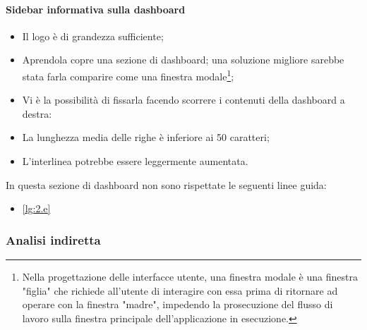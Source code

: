 \paragraph{Sidebar informativa sulla dashboard}
\begin{itemize}
    \item Il logo è di grandezza sufficiente;
    \item Aprendola copre una sezione di dashboard; una soluzione migliore sarebbe stata farla comparire come una finestra modale\footnote{Nella progettazione delle interfacce utente, una finestra modale è una finestra "figlia" che richiede all'utente di interagire con essa prima di ritornare ad operare con la finestra "madre", impedendo la prosecuzione del flusso di lavoro sulla finestra principale dell'applicazione in esecuzione.};
    \item Vi è la possibilità di fissarla facendo scorrere i contenuti della dashboard a destra:
    \item La lunghezza media delle righe è inferiore ai 50 caratteri;
    \item L'interlinea potrebbe essere leggermente aumentata.
\end{itemize}
In questa sezione di dashboard non sono rispettate le seguenti linee guida:
\begin{itemize}
    \item \ref{lg:2.e}
\end{itemize}

\subsubsection{Analisi indiretta}
